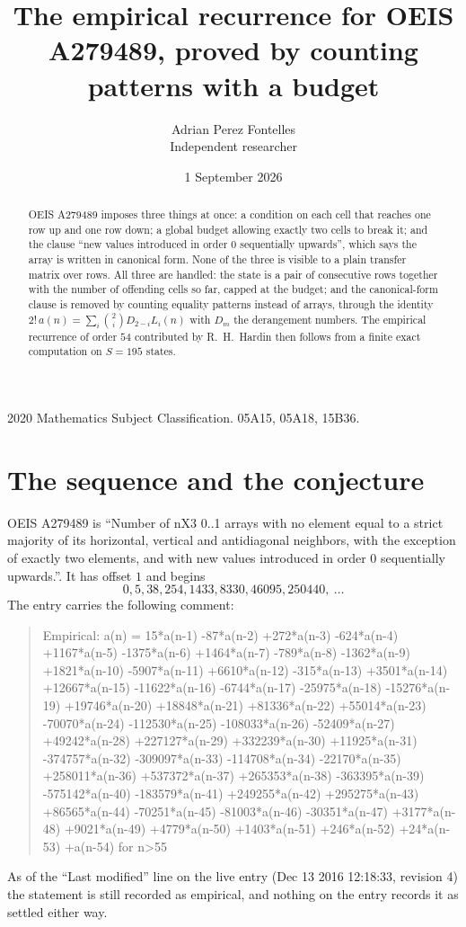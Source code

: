 \documentclass[11pt,a4paper]{article}
\title{The empirical recurrence for OEIS A279489, proved by counting patterns with a budget}
\author{Adrian Perez Fontelles\\ \small Independent researcher}
\date{1 September 2026}
\theoremstyle{plain}
\theoremstyle{definition}
\begin{document}
\maketitle

\begin{abstract}
OEIS A279489 imposes three things at once: a condition on each cell that reaches one row up and
one row down; a global budget allowing exactly two cells to
break it; and the clause ``new values introduced in order $0$ sequentially upwards'', which
says the array is written in canonical form. None of the three is visible to a plain transfer
matrix over rows. All three are handled: the state is a pair of consecutive rows
together with the number of offending cells so far, capped at the budget; and the
canonical-form clause is removed by counting equality patterns instead of arrays, through the
identity $2!\,a(n)=\sum_i\binom{2}{i}D_{2-i}L_i(n)$ with $D_m$ the derangement
numbers. The empirical recurrence of order $54$ contributed by R.~H.~Hardin then follows
from a finite exact computation on $S=195$ states.
\end{abstract}

\noindent\small 2020 Mathematics Subject Classification. 05A15, 05A18, 15B36.\normalsize

\section{The sequence and the conjecture}

OEIS A279489 is ``Number of nX3 0..1 arrays with no element equal to a strict majority of its horizontal, vertical and antidiagonal neighbors, with the exception of exactly two elements, and with new values introduced in order 0 sequentially upwards.''. It has offset $1$ and begins
\[
0, 5, 38, 254, 1433, 8330, 46095, 250440,\ \dots
\]
The entry carries the following comment:
\begin{quote}\small
Empirical: a(n) = 15*a(n-1) -87*a(n-2) +272*a(n-3) -624*a(n-4) +1167*a(n-5) -1375*a(n-6) +1464*a(n-7) -789*a(n-8) -1362*a(n-9) +1821*a(n-10) -5907*a(n-11) +6610*a(n-12) -315*a(n-13) +3501*a(n-14) +12667*a(n-15) -11622*a(n-16) -6744*a(n-17) -25975*a(n-18) -15276*a(n-19) +19746*a(n-20) +18848*a(n-21) +81336*a(n-22) +55014*a(n-23) -70070*a(n-24) -112530*a(n-25) -108033*a(n-26) -52409*a(n-27) +49242*a(n-28) +227127*a(n-29) +332239*a(n-30) +11925*a(n-31) -374757*a(n-32) -309097*a(n-33) -114708*a(n-34) -22170*a(n-35) +258011*a(n-36) +537372*a(n-37) +265353*a(n-38) -363395*a(n-39) -575142*a(n-40) -183579*a(n-41) +249255*a(n-42) +295275*a(n-43) +86565*a(n-44) -70251*a(n-45) -81003*a(n-46) -30351*a(n-47) +3177*a(n-48) +9021*a(n-49) +4779*a(n-50) +1403*a(n-51) +246*a(n-52) +24*a(n-53) +a(n-54) for n>55
\end{quote}
As of the ``Last modified'' line on the live entry (Dec 13 2016 12:18:33, revision 4) the statement is
still recorded as empirical, and nothing on the entry records it as settled either way.
\end{document}
